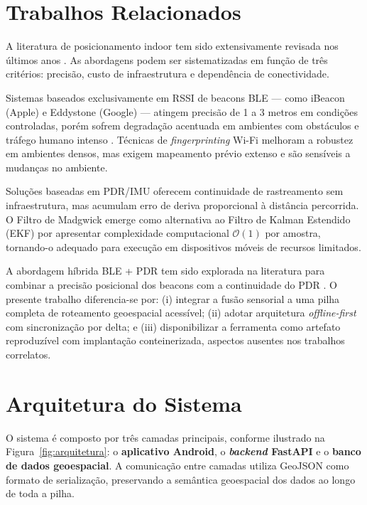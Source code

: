 \documentclass[12pt]{article}
\begin{document}
\section{Trabalhos Relacionados}

A literatura de posicionamento indoor tem sido extensivamente revisada nos últimos
anos \cite{Zafari2019, Liu2007}. As abordagens podem ser sistematizadas em função
de três critérios: precisão, custo de infraestrutura e dependência de conectividade.

Sistemas baseados exclusivamente em RSSI de beacons BLE --- como iBeacon (Apple) e
Eddystone (Google) --- atingem precisão de 1 a 3 metros em condições controladas,
porém sofrem degradação acentuada em ambientes com obstáculos e tráfego humano
intenso \cite{Faragher2015}. Técnicas de \textit{fingerprinting} Wi-Fi melhoram a
robustez em ambientes densos, mas exigem mapeamento prévio extenso e são sensíveis
a mudanças no ambiente.

Soluções baseadas em PDR/IMU oferecem continuidade de rastreamento sem infraestrutura,
mas acumulam erro de deriva proporcional à distância percorrida. O Filtro de Madgwick
\cite{Madgwick2010} emerge como alternativa ao Filtro de Kalman Estendido (EKF) por
apresentar complexidade computacional $\mathcal{O}(1)$ por amostra, tornando-o
adequado para execução em dispositivos móveis de recursos limitados.

A abordagem híbrida BLE + PDR tem sido explorada na literatura para combinar a
precisão posicional dos beacons com a continuidade do PDR \cite{Jimenez2009}.
O presente trabalho diferencia-se por: (i) integrar a fusão sensorial a uma pilha
completa de roteamento geoespacial acessível; (ii) adotar arquitetura
\textit{offline-first} com sincronização por delta; e (iii) disponibilizar a
ferramenta como artefato reproduzível com implantação conteinerizada, aspectos
ausentes nos trabalhos correlatos.

\section{Arquitetura do Sistema}

O sistema é composto por três camadas principais, conforme ilustrado na
Figura~\ref{fig:arquitetura}: o \textbf{aplicativo Android}, o
\textbf{\textit{backend} FastAPI} e o \textbf{banco de dados geoespacial}.
A comunicação entre camadas utiliza GeoJSON como formato de serialização,
preservando a semântica geoespacial dos dados ao longo de toda a pilha.
\end{document}
